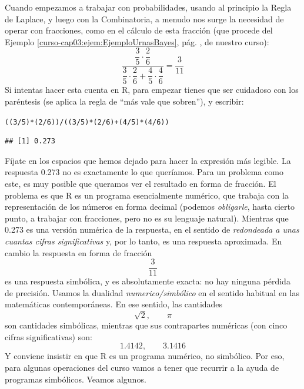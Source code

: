 \documentclass[10pt,a4paper]{article}\usepackage[]{graphicx}\usepackage[]{color}
\makeatletter
\newcommand{\hlnum}[1]{\textcolor[rgb]{0.686,0.059,0.569}{#1}}%
\newcommand{\hlopt}[1]{\textcolor[rgb]{0,0,0}{#1}}%
\newcommand{\hlstd}[1]{\textcolor[rgb]{0.345,0.345,0.345}{#1}}%
\newenvironment{kframe}{%
 \def\at@end@of@kframe{}%
 \ifinner\ifhmode%
  \def\at@end@of@kframe{\end{minipage}}%
  \begin{minipage}{\columnwidth}%
 \fi\fi%
 \def\FrameCommand##1{\hskip\@totalleftmargin \hskip-\fboxsep
 \colorbox{shadecolor}{##1}\hskip-\fboxsep
     \hskip-\linewidth \hskip-\@totalleftmargin \hskip\columnwidth}%
 \MakeFramed {\advance\hsize-\width
   \@totalleftmargin\z@ \linewidth\hsize
   \@setminipage}}%
 {\par\unskip\endMakeFramed%
 \at@end@of@kframe}
\newenvironment{knitrout}{}{} %
\newcounter {cont01}
\makeatother
\begin{document}
Cuando empezamos a trabajar con probabilidades, usando al principio la Regla de Laplace, y luego con la Combinatoria, a menudo nos surge la necesidad de operar con fracciones,  como en el cálculo de esta fracción (que procede del Ejemplo \ref{curso-cap03:ejem:EjemploUrnasBayes}, pág. \pageref{curso-cap03:ejem:EjemploUrnasBayes}, de nuestro curso):
     \[
          \dfrac{\dfrac{3}{5}\cdot \dfrac{2}{6}}{\dfrac{3}{5}\cdot \dfrac{2}{6}+\dfrac{4}{5}\cdot\dfrac{4}{6}}=\dfrac{3}{11}
          \]
Si intentas hacer esta cuenta en R, para empezar tienes que ser cuidadoso con los paréntesis (se aplica la regla de ``más vale que sobren''), y escribir:
\begin{knitrout}
\color{fgcolor}\begin{kframe}
\begin{alltt}
\hlstd{( (}\hlnum{3}\hlopt{/}\hlnum{5}\hlstd{)} \hlopt{*} \hlstd{(}\hlnum{2}\hlopt{/}\hlnum{6}\hlstd{) )} \hlopt{/}\hlstd{( (}\hlnum{3}\hlopt{/}\hlnum{5}\hlstd{)} \hlopt{*} \hlstd{(}\hlnum{2}\hlopt{/}\hlnum{6}\hlstd{)} \hlopt{+} \hlstd{(}\hlnum{4}\hlopt{/}\hlnum{5}\hlstd{)} \hlopt{*} \hlstd{(}\hlnum{4}\hlopt{/}\hlnum{6}\hlstd{) )}
\end{alltt}
\begin{verbatim}
## [1] 0.273
\end{verbatim}
\end{kframe}
\end{knitrout}
     Fíjate en los espacios que hemos dejado para hacer la expresión más legible. La respuesta
0.273
no es exactamente lo que queríamos. Para un problema como este, es muy posible que queramos ver el resultado en forma de fracción. El problema es que R es un programa esencialmente {\sf numérico}, que trabaja con la representación de los números en forma decimal (podemos {\em obligarle}, hasta cierto punto, a trabajar con fracciones, pero no es su lenguaje natural). Mientras que 0.273 es una versión {\sf numérica} de la respuesta, en el sentido de {\em redondeada a unas cuantas cifras significativas} y, por lo tanto, es una respuesta aproximada. En cambio la respuesta en forma de fracción
\[
     \dfrac{3}{11}
     \]
es una respuesta {\sf simbólica}, y es absolutamente exacta: no hay ninguna pérdida de precisión. Usamos la dualidad {\em numerico/simbólico} en el sentido habitual en las matemáticas contemporáneas. En ese sentido, las cantidades
\[\sqrt{2},\qquad \pi\]
son cantidades simbólicas, mientras que sus contrapartes numéricas (con cinco cifras significativas) son:
     \[1.4142,\qquad 3.1416\]
Y conviene insistir en que R es un programa numérico, no simbólico. Por eso, para algunas operaciones del curso vamos a tener que recurrir a la ayuda de programas simbólicos. Veamos algunos.
\end{document}
